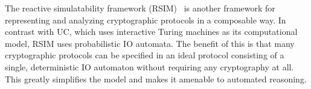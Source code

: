 The reactive simulatability framework (RSIM)~\cite{backes2007reactive} is
another framework for representing and analyzing cryptographic protocols in a
composable way. In contrast with UC, which uses interactive Turing machines as
its computational model, RSIM uses probabilistic IO automata. The benefit of
this is that many cryptographic protocols can be specified in an ideal protocol
consisting of a single, deterministic IO automaton without requiring any
cryptography at all. This greatly simplifies the model and makes it amenable to
automated reasoning.


\begin{comment}
\begin{enumerate}[leftmargin=*]
  \item Symbolic UC~\cite{bohl2016symbolic} transports ideas from the UC
    framework to the symbolic model of cryptography, in which cryptographic
    operations are abstracted as a term process algebra (specifically, a variant
    of the applied $\pi$-calculus) and adversary capabilities are defined by
    deduction rules over these terms. In particular, they show that certain
    aspects of the UC framework, such as ideal functionality specifications and
    UC composition, still carry over to the symbolic model. They are also able
    to show that certain results, such as the impossibility of UC commitments in
    the standard model of cryptography, can still be observed in the symbolic
    model. Although this abstract vantage point leads to simpler security proofs
    that can be amenable to automated reasoning, security guarantees derived
    from symbolic analyses are not as strong as those from computational
    analyses considered in UC and in cryptography more broadly.
  \item RSIM~\cite{backes2007reactive}.
  \item CertiCrypt~\cite{barthe2009formal} is a framework (built on
    Coq~\cite{barras1997coq}) that supports machine-checked game-based proofs of
    security. It includes tools to reason about the equivalence of probabilistic
    programs, a relational Hoare logic, a theory of observational equivalence,
    verified program transformations, and game-based techniques.  Their
    experience shows that the type system and automated tactics provide valuable
    information in debugging proofs.
  \item EasyCrypt~\cite{barthe2011computer} is follow-up work on CertiCrypt,

\end{comment}
